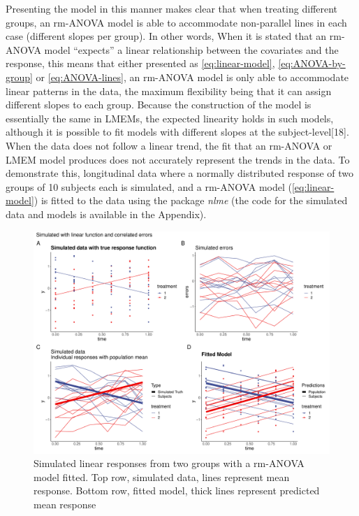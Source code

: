 \documentclass[
]{article}
\begin{document}
Presenting the model in this manner makes clear that when treating different groups, an rm-ANOVA model is able to accommodate non-parallel lines in each case (different slopes per group). In other words, When it is stated that an rm-ANOVA model ``expects'' a linear relationship between the covariates and the response, this means that either presented as \eqref{eq:linear-model}, \eqref{eq:ANOVA-by-group} or \eqref{eq:ANOVA-lines}, an rm-ANOVA model is only able to accommodate linear patterns in the data, the maximum flexibility being that it can assign different slopes to each group. Because the construction of the model is essentially the same in LMEMs, the expected linearity holds in such models, although it is possible to fit models with different slopes at the subject-level{[}18{]}.\\
When the data does not follow a linear trend, the fit that an rm-ANOVA or LMEM model produces does not accurately represent the trends in the data. To demonstrate this, longitudinal data where a normally distributed response of two groups of 10 subjects each is simulated, and a rm-ANOVA model (\eqref{eq:linear-model}) is fitted to the data using the package \emph{nlme} (the code for the simulated data and models is available in the Appendix).

\begin{figure}
\centering
\includegraphics{Manuscript_AM_v2_files/figure-latex/linear-model-1.pdf}
\caption{\label{fig:linear-model}Simulated linear responses from two groups with a rm-ANOVA model fitted. Top row, simulated data, lines represent mean response. Bottom row, fitted model, thick lines represent predicted mean response}
\end{figure}
\end{document}
